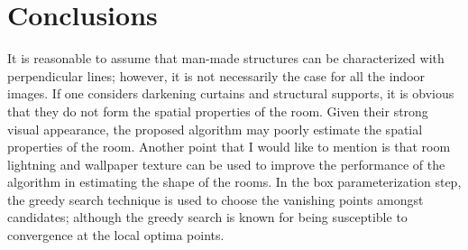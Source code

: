 \documentclass[11pt]{article}
\begin{document}
\section{Conclusions}
It is reasonable to assume that man-made structures can be characterized with perpendicular lines; however, it is not necessarily the case for all the indoor images.
If one considers darkening curtains and structural supports, it is obvious that they do not form the spatial properties of the room.
Given their strong visual appearance, the proposed algorithm may poorly estimate the spatial properties of the room.
Another point that I would like to mention is that room lightning and wallpaper texture can be used to improve the performance of the algorithm in estimating the shape of the rooms.
In the box parameterization step, the greedy search technique is used to choose the vanishing points amongst candidates; although the greedy search is known for being susceptible to convergence at the local optima points.
% 
% 
\end{document}
